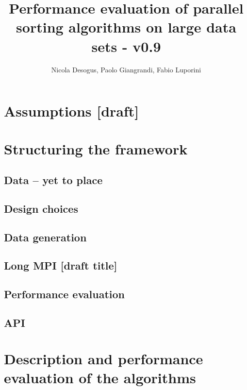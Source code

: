 \documentclass[a4paper,12pt,oneside,openright]{article}
\title{Performance evaluation of parallel sorting algorithms on large data sets - v0.9}
\author{Nicola Desogus, Paolo Giangrandi, Fabio Luporini}
\begin{document}
\maketitle
\tableofcontents
\pagebreak





\section{Assumptions [draft]}


\section{Structuring the framework}
\subsection{Data -- yet to place}

\subsection{Design choices}
\subsection{Data generation}
\subsection{Long MPI [draft title]}
\subsection{Performance evaluation}
\subsection{API}



\pagebreak

\section{Description and performance evaluation of the algorithms}











\end{document}
